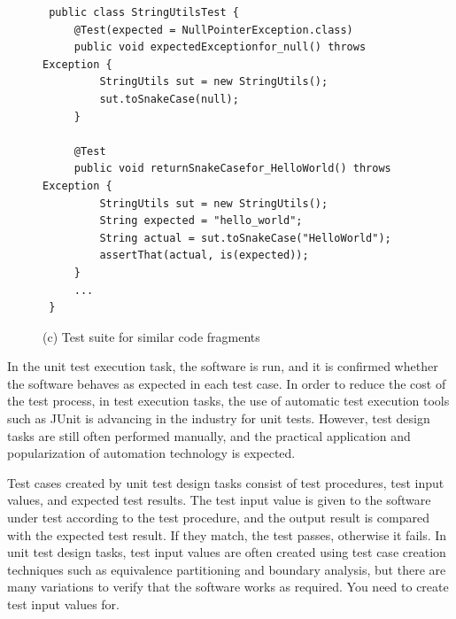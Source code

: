 \documentclass[conference]{IEEEtran}
\begin{document}
\begin{figure}[htbp]
\begin{center}
\begin{lstlisting}
 public class StringUtilsTest {
     @Test(expected = NullPointerException.class)
     public void expectedExceptionfor_null() throws Exception {
    	 StringUtils sut = new StringUtils();
    	 sut.toSnakeCase(null);
     }
    
     @Test
     public void returnSnakeCasefor_HelloWorld() throws Exception {
     	 StringUtils sut = new StringUtils();
    	 String expected = "hello_world";
    	 String actual = sut.toSnakeCase("HelloWorld");
         assertThat(actual, is(expected));
     }
     ...
 }
\end{lstlisting}
{\scriptsize (c) Test suite for similar code fragments}
\end{center}
\end{figure}

In the unit test execution task, the software is run, and it is confirmed whether the software behaves as expected in each test case. In order to reduce the cost of the test process, in test execution tasks, the use of automatic test execution tools such as JUnit is advancing in the industry for unit tests. However, test design tasks are still often performed manually, and the practical application and popularization of automation technology is expected.

Test cases created by unit test design tasks consist of test procedures, test input values, and expected test results. The test input value is given to the software under test according to the test procedure, and the output result is compared with the expected test result. If they match, the test passes, otherwise it fails. In unit test design tasks, test input values are often created using test case creation techniques such as equivalence partitioning and boundary analysis, but there are many variations to verify that the software works as required. You need to create test input values for.
\end{document}
